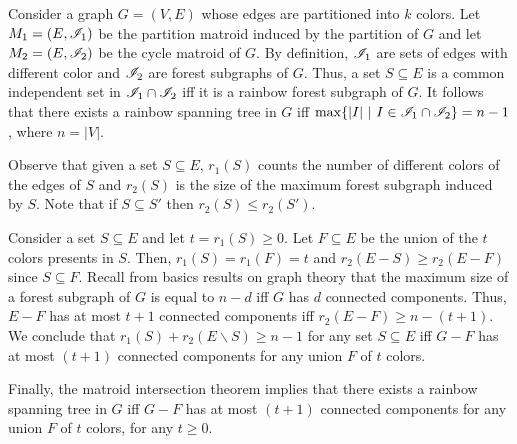 \vspace{3pt}

Consider a graph $G=(V,E)$ whose edges are partitioned into $k$ colors. Let $M_1=(E,\mathscr{I}_1)$ be the partition matroid induced by the partition of $G$ and let $M_2=(E,\mathscr{I}_2)$ be the cycle matroid of $G$. By definition, $\mathscr{I}_1$ are sets of edges with different color and $\mathscr{I}_2$ are forest subgraphs of $G$. Thus, a set $S\subseteq E$ is a common independent set in $\mathscr{I}_1\cap \mathscr{I}_2$ iff it is a rainbow forest subgraph of $G$. It follows that there exists a rainbow spanning tree in $G$ iff $\max\{|I| \ | \ I\in\I_1\cap\I_2\}=n-1$, where $n=|V|$.

Observe that given a set $S\subseteq E$, $r_1(S)$ counts the number of different colors of the edges of $S$ and $r_2(S)$ is the size of the maximum forest subgraph induced by $S$. Note that if $S\subseteq S'$ then $r_2(S)\leq r_2(S')$.

Consider a set $S\subseteq E$ and let $t=r_1(S)\geq 0$. Let $F\subseteq E$ be the union of the $t$ colors presents in $S$. Then, $r_1(S)=r_1(F)=t$ and $r_2(E-S)\geq r_2(E-F)$ since $S\subseteq F$. Recall from basics results on graph theory that the maximum size of a forest subgraph of $G$ is equal to $n-d$ iff $G$ has $d$ connected components. Thus, $E-F$ has at most $t+1$ connected components iff $r_2(E-F)\geq n-(t+1)$. We conclude that $r_1(S)+r_2(E \backslash S)\geq n-1$ for any set $S\subseteq E$ iff $G-F$ has at most $(t+1)$ connected components for any union $F$ of $t$ colors.

Finally, the matroid intersection theorem implies that there exists a rainbow spanning tree in $G$ iff $G-F$ has at most $(t+1)$ connected components for any union $F$ of $t$ colors, for any $t\geq 0$.
